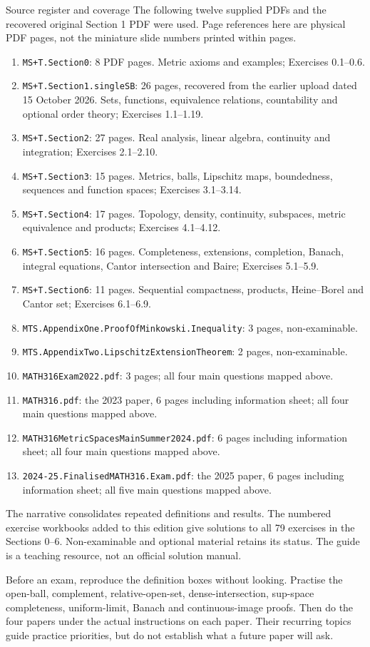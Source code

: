 \begin{note}{Source register and coverage}
The following twelve supplied PDFs and the recovered original Section 1 PDF were used. Page references here are physical PDF pages, not the miniature slide numbers printed within pages.
\begin{enumerate}
\item \texttt{MS+T.Section0}: 8 PDF pages. Metric axioms and examples; Exercises 0.1--0.6.
\item \texttt{MS+T.Section1.singleSB}: 26 pages, recovered from the earlier upload dated 15 October 2026. Sets, functions, equivalence relations, countability and optional order theory; Exercises 1.1--1.19.
\item \texttt{MS+T.Section2}: 27 pages. Real analysis, linear algebra, continuity and integration; Exercises 2.1--2.10.
\item \texttt{MS+T.Section3}: 15 pages. Metrics, balls, Lipschitz maps, boundedness, sequences and function spaces; Exercises 3.1--3.14.
\item \texttt{MS+T.Section4}: 17 pages. Topology, density, continuity, subspaces, metric equivalence and products; Exercises 4.1--4.12.
\item \texttt{MS+T.Section5}: 16 pages. Completeness, extensions, completion, Banach, integral equations, Cantor intersection and Baire; Exercises 5.1--5.9.
\item \texttt{MS+T.Section6}: 11 pages. Sequential compactness, products, Heine--Borel and Cantor set; Exercises 6.1--6.9.
\item \texttt{MTS.AppendixOne.ProofOfMinkowski.Inequality}: 3 pages, non-examinable.
\item \texttt{MTS.AppendixTwo.LipschitzExtensionTheorem}: 2 pages, non-examinable.
\item \texttt{MATH316Exam2022.pdf}: 3 pages; all four main questions mapped above.
\item \texttt{MATH316.pdf}: the 2023 paper, 6 pages including information sheet; all four main questions mapped above.
\item \texttt{MATH316MetricSpacesMainSummer2024.pdf}: 6 pages including information sheet; all four main questions mapped above.
\item \texttt{2024-25.FinalisedMATH316.Exam.pdf}: the 2025 paper, 6 pages including information sheet; all five main questions mapped above.
\end{enumerate}
The narrative consolidates repeated definitions and results. The numbered exercise workbooks added to this edition give solutions to all 79 exercises in the Sections 0--6. Non-examinable and optional material retains its status. The guide is a teaching resource, not an official solution manual.
\end{note}
\begin{tip}
Before an exam, reproduce the definition boxes without looking. Practise the open-ball, complement, relative-open-set, dense-intersection, sup-space completeness, uniform-limit, Banach and continuous-image proofs. Then do the four papers under the actual instructions on each paper. Their recurring topics guide practice priorities, but do not establish what a future paper will ask.
\end{tip}

